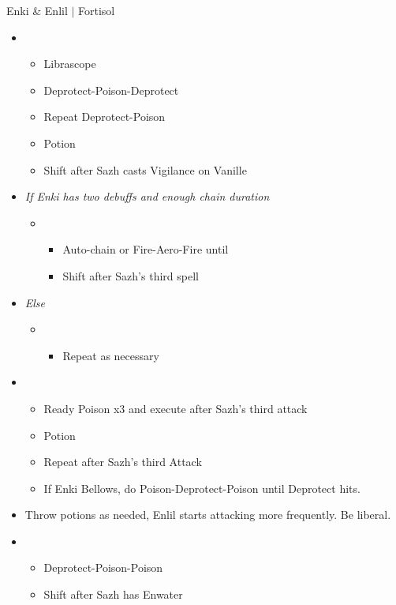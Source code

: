 \begin{battle}{Enki \& Enlil $|$ Fortisol}
\begin{multicols}{2}
\begin{itemize}
\begin{itemize}
        \end{itemize}
    \item \second
    \begin{itemize}
        \item Librascope
        \item Deprotect-Poison-Deprotect
        \item Repeat Deprotect-Poison
        \item Potion
        \item Shift after Sazh casts Vigilance on Vanille
    \end{itemize}
    \item \textit{If Enki has two debuffs and enough chain duration}
    \begin{itemize}
        \item \fourth
        \begin{itemize}
            \item Auto-chain or Fire-Aero-Fire until \stagger
            \item Shift after Sazh's third spell
        \end{itemize}
    \end{itemize}
    \item \textit{Else}
    \begin{itemize}
        \item \fifth
        \begin{itemize}
            \item Repeat as necessary
        \end{itemize}
    \end{itemize}
    \item \sixth
    \begin{itemize}
        \item Ready Poison x3 and execute after Sazh's third attack
        \item Potion
        \item Repeat after Sazh's third Attack
        \item If Enki Bellows, do Poison-Deprotect-Poison until Deprotect hits.
    \end{itemize}
    \item Throw potions as needed, Enlil starts attacking more frequently. Be liberal.
    \item \third
    \begin{itemize}
        \item Deprotect-Poison-Poison
        \item Shift after Sazh has Enwater

\end{itemize}
\end{itemize}
\end{multicols}
\end{battle}
